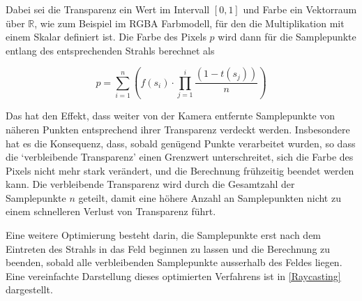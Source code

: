\documentclass[a4paper,fontsize=12pt,toc=bib,halfparskip]{scrartcl}
\begin{document}
Dabei sei die Transparenz ein Wert im Intervall $[0,1]$ und Farbe ein Vektorraum \"uber $\mathbb{R}$, wie zum Beispiel im RGBA Farbmodell, f\"ur den die Multiplikation mit einem Skalar definiert ist. Die Farbe des Pixels $p$ wird dann f\"ur die Samplepunkte entlang des entsprechenden Strahls berechnet als

\begin{equation}
	p = \sum_{i=1}^{n} \left(f(s_i) \cdot \prod_{j=1}^{i} \frac{(1-t(s_j))}{n}\right)
	\label{RaycastingFormula}
\end{equation}

Das hat den Effekt, dass weiter von der Kamera entfernte Samplepunkte von n\"aheren Punkten entsprechend ihrer Transparenz verdeckt werden. Insbesondere hat es die Konsequenz, dass, sobald gen\"ugend Punkte verarbeitet wurden, so dass die `verbleibende Transparenz' einen Grenzwert unterschreitet, sich die Farbe des Pixels nicht mehr stark ver\"andert, und die Berechnung fr\"uhzeitig beendet werden kann. Die verbleibende Transparenz wird durch die Gesamtzahl der Samplepunkte $n$ geteilt, damit eine h\"ohere Anzahl an Samplepunkten nicht zu einem schnelleren Verlust von Transparenz f\"uhrt.

Eine weitere Optimierung besteht darin, die Samplepunkte erst nach dem Eintreten des Strahls in das Feld beginnen zu lassen und die Berechnung zu beenden, sobald alle verbleibenden Samplepunkte ausserhalb des Feldes liegen. Eine vereinfachte Darstellung dieses optimierten Verfahrens ist in \ref{Raycasting} dargestellt.
 
\end{document}
